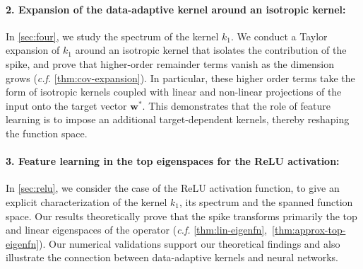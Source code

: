 \paragraph{2. Expansion of the data-adaptive kernel around an isotropic kernel:} In \cref{sec:four}, we study the spectrum of the kernel $k_1$. We conduct a Taylor expansion of $k_1$ around an isotropic kernel that isolates the contribution of the spike, and prove that higher-order remainder terms vanish as the dimension grows (\emph{c.f.} \cref{thm:cov-expansion}). In particular, these higher order terms take the form of isotropic kernels coupled with linear and non-linear projections of the input onto the target vector $\bm w^*$. This demonstrates that the role of feature learning is to impose an additional target-dependent kernels, thereby reshaping the function space. 

\paragraph{3. Feature learning in the top eigenspaces for the ReLU activation:} In \cref{sec:relu}, we consider the case of the ReLU activation function, to give an explicit characterization of the kernel $k_1$, its spectrum and the spanned function space. Our results theoretically prove that the spike transforms primarily the top and linear eigenspaces of the operator (\emph{c.f.} \cref{thm:lin-eigenfn},~\ref{thm:approx-top-eigenfn}). Our numerical validations support our theoretical findings and also illustrate the connection between data-adaptive kernels and neural networks.\\


